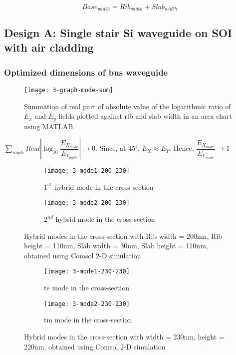 \documentclass[../report.tex]{subfiles}
\begin{document}
\begin{equation}\label{eq:wg_width_param}
Base_{width} = Rib_{width} + Slab_{width} 
\end{equation}
  
	
		\subsection{Design A: Single stair Si waveguide on SOI with air cladding}

\subsubsection{Optimized dimensions of bus waveguide}

\begin{figure}[H] %
	\centering
	\texttt{[image: 3-graph-mode-sum]}
	\caption{Summation of real part of absolute value of the logarithmic ratio of $E_x$ and $E_y$ fields plotted against rib and slab width in an area chart using MATLAB}
	\label{fig:3_graph_mode_sum}
\end{figure}

$\sum _{mode}Real\left| \log _{10}\dfrac {E_{X_{mode}}} {E_{Y_{mode}}}\right| \rightarrow 0$. Since, at $45{^\circ}$, $E_X \approx E_Y$. Hence, $\dfrac {E_{X_{mode}}} {E_{Y_{mode}}} \rightarrow 1$    

\begin{figure}[H] %
	\begin{subfigure}[t]{0.45\textwidth}
		\texttt{[image: 3-mode1-200-230]}
		\caption{$1^{st}$ hybrid mode in the cross-section}
		\label{fig:3_mode1_200_230}
	\end{subfigure}
	\hfill
	\begin{subfigure}[t]{0.45\textwidth}
		\texttt{[image: 3-mode2-200-230]}
		\caption{$2^{nd}$ hybrid mode in the cross-section}
		\label{fig:3_mode2_200_230}
	\end{subfigure}
	\caption{Hybrid modes in the cross-section with Rib width = 200nm, Rib height = 110nm, Slab width = 30nm, Slab height = 110nm, obtained using Comsol 2-D simulation}
\end{figure}

\begin{figure}[H] %
	\begin{subfigure}[t]{0.45\textwidth}
		\texttt{[image: 3-mode1-230-230]}
		\caption{\gls{te} mode in the cross-section}
		\label{fig:3_mode1_230_230}
	\end{subfigure}
	\hfill
	\begin{subfigure}[t]{0.45\textwidth}
		\texttt{[image: 3-mode2-230-230]}
		\caption{\gls{tm} mode in the cross-section}
		\label{fig:3_mode2_230_230}
	\end{subfigure}
	\caption{Hybrid modes in the cross-section with width = 230nm, height = 220nm, obtained using Comsol 2-D simulation}
\end{figure}
\end{document}
